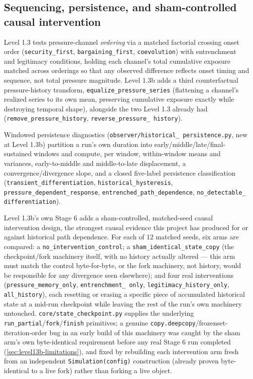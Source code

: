 \subsection{Sequencing, persistence, and sham-controlled causal intervention}
\label{sec:sequencing-and-intervention}

Level 1.3 tests pressure-channel \textit{ordering} via a matched factorial
crossing onset order (\texttt{security\_first}, \texttt{bargaining\_first},
\texttt{coevolution}) with entrenchment and legitimacy conditions, holding
each channel's total cumulative exposure matched across orderings so that
any observed difference reflects onset timing and sequence, not total
pressure magnitude. Level 1.3b adds a third counterfactual pressure-history
transform, \texttt{equalize\_pressure\_series} (flattening a channel's
realized series to its own mean, preserving cumulative exposure exactly
while destroying temporal shape), alongside the two Level 1.3 already
had (\texttt{remove\_pressure\_history}, \texttt{reverse\_pressure\_%
history}).

Windowed persistence diagnostics (\texttt{observer/historical\_%
persistence.py}, new at Level 1.3b) partition a run's own duration into
early/middle/late/final-sustained windows and compute, per window,
within-window means and variances, early-to-middle and middle-to-late
displacement, a convergence/divergence slope, and a closed five-label
persistence classification (\texttt{transient\_differentiation},
\texttt{historical\_hysteresis}, \texttt{pressure\_dependent\_response},
\texttt{entrenched\_path\_dependence}, \texttt{no\_detectable\_%
differentiation}).

Level 1.3b's own Stage 6 adds a sham-controlled, matched-seed causal
intervention design, the strongest causal evidence this project has
produced for or against historical path dependence. For each of 12 matched
seeds, six arms are compared: a \texttt{no\_intervention\_control}; a
\texttt{sham\_identical\_state\_copy} (the checkpoint/fork machinery
itself, with no history actually altered --- this arm must match the
control byte-for-byte, or the fork machinery, not history, would be
responsible for any divergence seen elsewhere); and four real
interventions (\texttt{pressure\_memory\_only}, \texttt{entrenchment\_%
only}, \texttt{legitimacy\_history\_only}, \texttt{all\_history}), each
resetting or erasing a specific piece of accumulated historical state at a
mid-run checkpoint while leaving the rest of the run's own machinery
untouched. \texttt{core/state\_checkpoint.py} supplies the underlying
\texttt{run\_partial}/\texttt{fork}/\texttt{finish} primitives; a genuine
\texttt{copy.deepcopy}/frozenset-iteration-order bug in an early build of
this machinery was caught by the sham arm's own byte-identical requirement
before any real Stage 6 run completed (\cref{sec:level13b-limitations}),
and fixed by rebuilding each intervention arm fresh from an independent
\texttt{Simulation(config)} construction (already proven byte-identical to
a live fork) rather than forking a live object.

